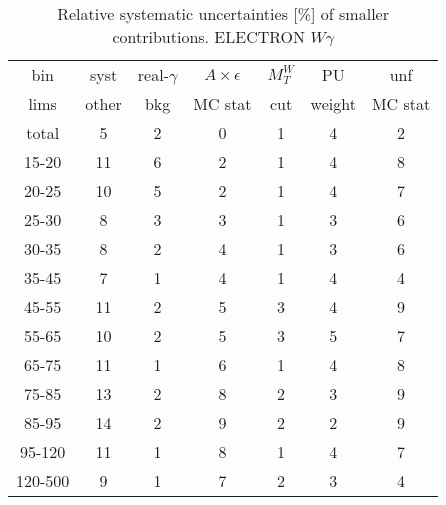 \begin{table}[h]
  \scriptsize
  \begin{center}
  \caption{Relative systematic uncertainties [\%] of smaller contributions. ELECTRON $W\gamma$}
  \begin{tabular}{|c|c|c|c|c|c|c|}
    bin  & syst & real-$\gamma$ & $A\times\epsilon$ & $M_T^W$ & PU & unf\\
    lims  & other & bkg & MC stat & cut & weight & MC stat\\ \hline
    total  & 5 & 2 & 0 & 1 & 4 & 2 \\ \hline
    15-20 & 11 & 6 & 2 & 1 & 4 & 8 \\ \hline
    20-25 & 10 & 5 & 2 & 1 & 4 & 7 \\ \hline
    25-30 & 8 & 3 & 3 & 1 & 3 & 6 \\ \hline
    30-35 & 8 & 2 & 4 & 1 & 3 & 6 \\ \hline
    35-45 & 7 & 1 & 4 & 1 & 4 & 4 \\ \hline
    45-55 & 11 & 2 & 5 & 3 & 4 & 9 \\ \hline
    55-65 & 10 & 2 & 5 & 3 & 5 & 7 \\ \hline
    65-75 & 11 & 1 & 6 & 1 & 4 & 8 \\ \hline
    75-85 & 13 & 2 & 8 & 2 & 3 & 9 \\ \hline
    85-95 & 14 & 2 & 9 & 2 & 2 & 9 \\ \hline
    95-120 & 11 & 1 & 8 & 1 & 4 & 7 \\ \hline
    120-500 & 9 & 1 & 7 & 2 & 3 & 4 \\ \hline
  \end{tabular}
  \label{tab:systInPercentSmallSysts_ELECTRON_WGamma}
  \end{center}
\end{table}

